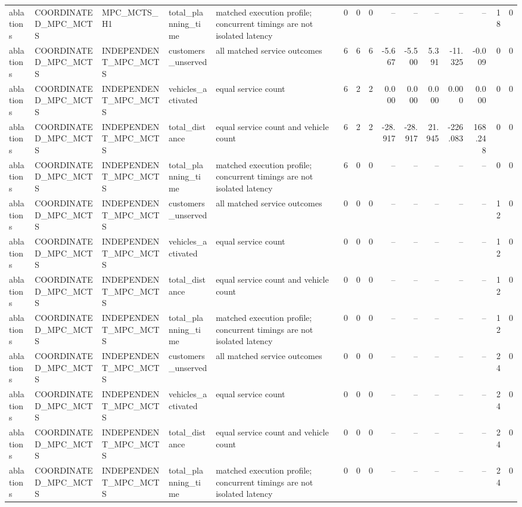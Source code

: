 \begin{table}
{\begin{tabular}{lllllrrrrrrrrrr}
ablations & COORDINATED\_MPC\_MCTS & MPC\_MCTS\_H1 & total\_planning\_time & matched execution profile; concurrent timings are not isolated latency & 0 & 0 & 0 & -- & -- & -- & -- & -- & 18 & 0 \\
ablations & COORDINATED\_MPC\_MCTS & INDEPENDENT\_MPC\_MCTS & customers\_unserved & all matched service outcomes & 6 & 6 & 6 & -5.667 & -5.500 & 5.391 & -11.325 & -0.009 & 0 & 0 \\
ablations & COORDINATED\_MPC\_MCTS & INDEPENDENT\_MPC\_MCTS & vehicles\_activated & equal service count & 6 & 2 & 2 & 0.000 & 0.000 & 0.000 & 0.000 & 0.000 & 0 & 0 \\
ablations & COORDINATED\_MPC\_MCTS & INDEPENDENT\_MPC\_MCTS & total\_distance & equal service count and vehicle count & 6 & 2 & 2 & -28.917 & -28.917 & 21.945 & -226.083 & 168.248 & 0 & 0 \\
ablations & COORDINATED\_MPC\_MCTS & INDEPENDENT\_MPC\_MCTS & total\_planning\_time & matched execution profile; concurrent timings are not isolated latency & 6 & 0 & 0 & -- & -- & -- & -- & -- & 0 & 0 \\
ablations & COORDINATED\_MPC\_MCTS & INDEPENDENT\_MPC\_MCTS & customers\_unserved & all matched service outcomes & 0 & 0 & 0 & -- & -- & -- & -- & -- & 12 & 0 \\
ablations & COORDINATED\_MPC\_MCTS & INDEPENDENT\_MPC\_MCTS & vehicles\_activated & equal service count & 0 & 0 & 0 & -- & -- & -- & -- & -- & 12 & 0 \\
ablations & COORDINATED\_MPC\_MCTS & INDEPENDENT\_MPC\_MCTS & total\_distance & equal service count and vehicle count & 0 & 0 & 0 & -- & -- & -- & -- & -- & 12 & 0 \\
ablations & COORDINATED\_MPC\_MCTS & INDEPENDENT\_MPC\_MCTS & total\_planning\_time & matched execution profile; concurrent timings are not isolated latency & 0 & 0 & 0 & -- & -- & -- & -- & -- & 12 & 0 \\
ablations & COORDINATED\_MPC\_MCTS & INDEPENDENT\_MPC\_MCTS & customers\_unserved & all matched service outcomes & 0 & 0 & 0 & -- & -- & -- & -- & -- & 24 & 0 \\
ablations & COORDINATED\_MPC\_MCTS & INDEPENDENT\_MPC\_MCTS & vehicles\_activated & equal service count & 0 & 0 & 0 & -- & -- & -- & -- & -- & 24 & 0 \\
ablations & COORDINATED\_MPC\_MCTS & INDEPENDENT\_MPC\_MCTS & total\_distance & equal service count and vehicle count & 0 & 0 & 0 & -- & -- & -- & -- & -- & 24 & 0 \\
ablations & COORDINATED\_MPC\_MCTS & INDEPENDENT\_MPC\_MCTS & total\_planning\_time & matched execution profile; concurrent timings are not isolated latency & 0 & 0 & 0 & -- & -- & -- & -- & -- & 24 & 0 \\

\end{tabular}}
\end{table}
